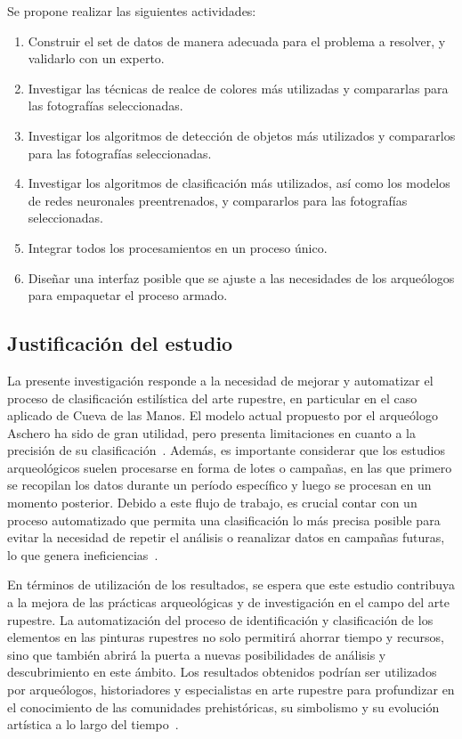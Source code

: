 Se propone realizar las siguientes actividades:
\begin{enumerate}
    \item Construir el set de datos de manera adecuada para el problema a resolver, y validarlo con un experto.
    \item Investigar las técnicas de realce de colores más utilizadas y compararlas para las fotografías seleccionadas.
    \item Investigar los algoritmos de detección de objetos más utilizados y compararlos para las fotografías seleccionadas.
    \item Investigar los algoritmos de clasificación más utilizados, así como los modelos de redes neuronales preentrenados, y compararlos para las fotografías seleccionadas.
    \item Integrar todos los procesamientos en un proceso único.
    \item Diseñar una interfaz posible que se ajuste a las necesidades de los arqueólogos para empaquetar el proceso armado.
\end{enumerate}

\subsection{Justificación del estudio}

La presente investigación responde a la necesidad de mejorar y automatizar el proceso de clasificación estilística del arte rupestre, en particular en el caso aplicado de Cueva de las Manos. El modelo actual propuesto por el arqueólogo Aschero ha sido de gran utilidad, pero presenta limitaciones en cuanto a la precisión de su clasificación~\cite{aschero2000}. Además, es importante considerar que los estudios arqueológicos suelen procesarse en forma de lotes o campañas, en las que primero se recopilan los datos durante un período específico y luego se procesan en un momento posterior. Debido a este flujo de trabajo, es crucial contar con un proceso automatizado que permita una clasificación lo más precisa posible para evitar la necesidad de repetir el análisis o reanalizar datos en campañas futuras, lo que genera ineficiencias~\cite{aschero1998}.

En términos de utilización de los resultados, se espera que este estudio contribuya a la mejora de las prácticas arqueológicas y de investigación en el campo del arte rupestre. La automatización del proceso de identificación y clasificación de los elementos en las pinturas rupestres no solo permitirá ahorrar tiempo y recursos, sino que también abrirá la puerta a nuevas posibilidades de análisis y descubrimiento en este ámbito. Los resultados obtenidos podrían ser utilizados por arqueólogos, historiadores y especialistas en arte rupestre para profundizar en el conocimiento de las comunidades prehistóricas, su simbolismo y su evolución artística a lo largo del tiempo~\cite{aschero2018}.

